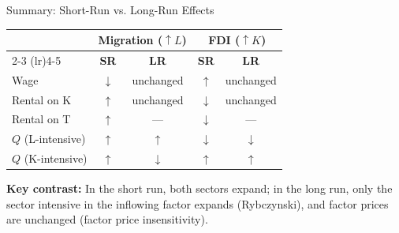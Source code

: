 \documentclass{beamer}
\begin{document}
\begin{frame}{Summary: Short-Run vs. Long-Run Effects}

\begin{center}
\small
\begin{tabular}{lcccc}
\toprule
& \multicolumn{2}{c}{\textbf{Migration ($\uparrow L$)}} & \multicolumn{2}{c}{\textbf{FDI ($\uparrow K$)}} \\
\cmidrule(lr){2-3} \cmidrule(lr){4-5}
& \textbf{SR} & \textbf{LR} & \textbf{SR} & \textbf{LR} \\
\midrule
Wage & $\downarrow$ & unchanged & $\uparrow$ & unchanged \\
Rental on K & $\uparrow$ & unchanged & $\downarrow$ & unchanged \\
Rental on T & $\uparrow$ & --- & $\downarrow$ & --- \\
\midrule
$Q$ (L-intensive) & $\uparrow$ & $\uparrow$ & $\downarrow$ & $\downarrow$ \\
$Q$ (K-intensive) & $\uparrow$ & $\downarrow$ & $\uparrow$ & $\uparrow$ \\
\bottomrule
\end{tabular}
\end{center}

\vspace{0.3cm}

\textbf{Key contrast:} In the short run, both sectors expand; in the long run, only the sector intensive in the inflowing factor expands (Rybczynski), and factor prices are unchanged (factor price insensitivity).

\end{frame}


\end{document}
